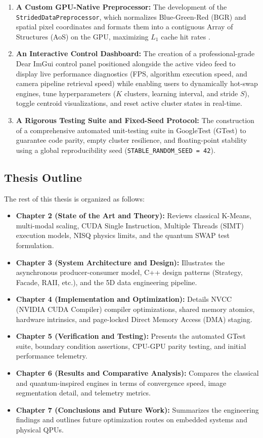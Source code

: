 \begin{enumerate}
    \item \textbf{A Custom GPU-Native Preprocessor:} The development of the \texttt{StridedData\allowbreak Preprocessor}, which normalizes Blue-Green-Red (BGR) and spatial pixel coordinates and formats them into a contiguous Array of Structures (AoS) on the GPU, maximizing $L_1$ cache hit rates \cite{CudaGuide}.
    \item \textbf{An Interactive Control Dashboard:} The creation of a professional-grade Dear ImGui \cite{ImGui} control panel positioned alongside the active video feed to display live performance diagnostics (FPS, algorithm execution speed, and camera pipeline retrieval speed) while enabling users to dynamically hot-swap engines, tune hyperparameters ($K$ clusters, learning interval, and stride $S$), toggle centroid visualizations, and reset active cluster states in real-time.
    \item \textbf{A Rigorous Testing Suite and Fixed-Seed Protocol:} The construction of a comprehensive automated unit-testing suite in GoogleTest (GTest) \cite{googletest} to guarantee code parity, empty cluster resilience, and floating-point stability using a global reproducibility seed (\texttt{STABLE\_RANDOM\_SEED = 42}).
\end{enumerate}

\subsection{Thesis Outline}
The rest of this thesis is organized as follows:
\begin{itemize}
    \item \textbf{Chapter 2 (State of the Art and Theory):} Reviews classical K-Means, multi-modal scaling, CUDA Single Instruction, Multiple Threads (SIMT) execution models, NISQ physics limits, and the quantum SWAP test formulation.
    \item \textbf{Chapter 3 (System Architecture and Design):} Illustrates the asynchronous producer-consumer model, C++ design patterns (Strategy, Facade, RAII, etc.), and the 5D data engineering pipeline.
    \item \textbf{Chapter 4 (Implementation and Optimization):} Details NVCC (NVIDIA CUDA Compiler) compiler optimizations, shared memory atomics, hardware intrinsics, and page-locked Direct Memory Access (DMA) staging.
    \item \textbf{Chapter 5 (Verification and Testing):} Presents the automated GTest suite, boundary condition assertions, CPU-GPU parity testing, and initial performance telemetry.
    \item \textbf{Chapter 6 (Results and Comparative Analysis):} Compares the classical and quantum-inspired engines in terms of convergence speed, image segmentation detail, and telemetry metrics.
    \item \textbf{Chapter 7 (Conclusions and Future Work):} Summarizes the engineering findings and outlines future optimization routes on embedded systems and physical QPUs.
\end{itemize}

